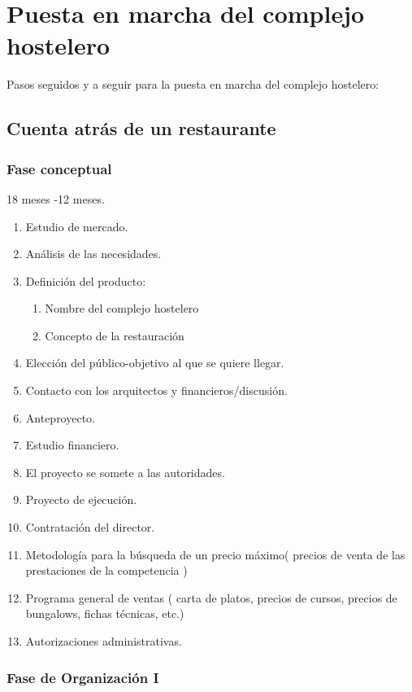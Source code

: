 \chapter{Puesta en marcha del complejo hostelero}
\label{chap:pasos}

Pasos seguidos y a seguir para la puesta en marcha del complejo hostelero:


\section{Cuenta atrás de un restaurante}
\label{sec:cuentaAtras}

\subsection{Fase conceptual}
\label{sec:conceptual}

18 meses -12 meses.

\begin{enumerate}
\item Estudio de mercado.
\item Análisis de las necesidades.
\item Definición del producto:
	\begin{enumerate}
		\item Nombre del complejo hostelero
		\item Concepto de la restauración
	\end{enumerate}
\item Elección del público-objetivo al que se quiere llegar.
\item Contacto con los arquitectos y financieros/discusión.
\item Anteproyecto.
\item Estudio financiero.
\item El proyecto se somete a las autoridades.
\item Proyecto de ejecución.
\item Contratación del director.
\item Metodología para la búsqueda de un precio máximo( precios de venta de las prestaciones de la competencia )
\item Programa general de ventas ( carta de platos, precios de cursos, precios de bungalows, fichas técnicas, etc.)
\item Autorizaciones administrativas.
\end{enumerate}

\subsection{Fase de Organización I}
\label{sec:organizacion1}

